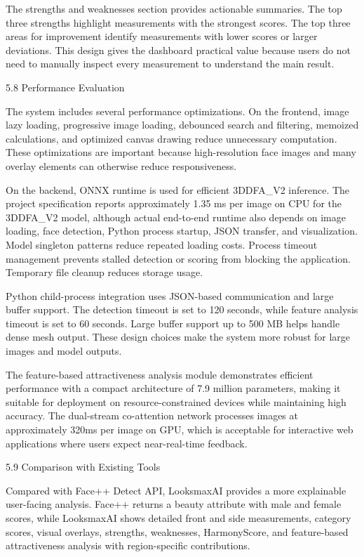 The strengths and weaknesses section provides actionable summaries. The top three strengths highlight measurements with the strongest scores. The top three areas for improvement identify measurements with lower scores or larger deviations. This design gives the dashboard practical value because users do not need to manually inspect every measurement to understand the main result.

5.8  Performance Evaluation

The system includes several performance optimizations. On the frontend, image lazy loading, progressive image loading, debounced search and filtering, memoized calculations, and optimized canvas drawing reduce unnecessary computation. These optimizations are important because high-resolution face images and many overlay elements can otherwise reduce responsiveness.

On the backend, ONNX runtime is used for efficient 3DDFA_V2 inference. The project specification reports approximately 1.35 ms per image on CPU for the 3DDFA_V2 model, although actual end-to-end runtime also depends on image loading, face detection, Python process startup, JSON transfer, and visualization. Model singleton patterns reduce repeated loading costs. Process timeout management prevents stalled detection or scoring from blocking the application. Temporary file cleanup reduces storage usage.

Python child-process integration uses JSON-based communication and large buffer support. The detection timeout is set to 120 seconds, while feature analysis timeout is set to 60 seconds. Large buffer support up to 500 MB helps handle dense mesh output. These design choices make the system more robust for large images and model outputs.

The feature-based attractiveness analysis module demonstrates efficient performance with a compact architecture of 7.9 million parameters, making it suitable for deployment on resource-constrained devices while maintaining high accuracy. The dual-stream co-attention network processes images at approximately 320ms per image on GPU, which is acceptable for interactive web applications where users expect near-real-time feedback.

5.9  Comparison with Existing Tools

Compared with Face++ Detect API, LooksmaxAI provides a more explainable user-facing analysis. Face++ returns a beauty attribute with male and female scores, while LooksmaxAI shows detailed front and side measurements, category scores, visual overlays, strengths, weaknesses, HarmonyScore, and feature-based attractiveness analysis with region-specific contributions.

